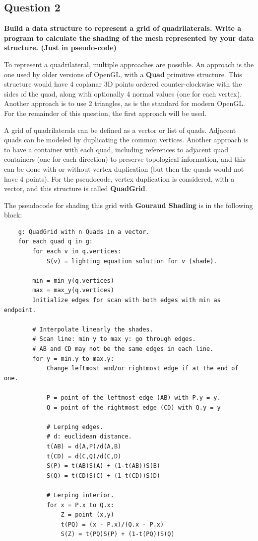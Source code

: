 \documentclass[12pt]{article}
\begin{document}
\subsection*{Question 2}
{\bfseries Build a data structure to represent a grid of quadrilaterals. Write a program to calculate the shading of the mesh represented by your data structure. (Just in pseudo-code)}

To represent a quadrilateral, multiple approaches are possible. An approach is the one used by older versions of OpenGL, with a \textbf{Quad} primitive structure. This structure would have 4 coplanar 3D points ordered counter-clockwise with the sides of the quad, along with optionally 4 normal values (one for each vertex). Another approach is to use 2 triangles, as is the standard for modern OpenGL. For the remainder of this question, the first approach will be used.

A grid of quadrilaterals can be defined as a vector or list of quads. Adjacent quads can be modeled by duplicating the common vertices. Another approach is to have a container with each quad, including references to adjacent quad containers (one for each direction) to preserve topological information, and this can be done with or without vertex duplication (but then the quads would not have 4 points). For the pseudocode, vertex duplication is considered, with a vector, and this structure is called \textbf{QuadGrid}.

The pseudocode for shading this grid with \textbf{Gouraud Shading} is in the following block:
\begin{verbatim}
    g: QuadGrid with n Quads in a vector.
    for each quad q in g:
        for each v in q.vertices:
            S(v) = lighting equation solution for v (shade).
            
        min = min_y(q.vertices)
        max = max_y(q.vertices)
        Initialize edges for scan with both edges with min as endpoint.
        
        # Interpolate linearly the shades.
        # Scan line: min y to max y: go through edges.
        # AB and CD may not be the same edges in each line.
        for y = min.y to max.y:
            Change leftmost and/or rightmost edge if at the end of one.
        
            P = point of the leftmost edge (AB) with P.y = y.
            Q = point of the rightmost edge (CD) with Q.y = y
            
            # Lerping edges.
            # d: euclidean distance.
            t(AB) = d(A,P)/d(A,B)
            t(CD) = d(C,Q)/d(C,D)
            S(P) = t(AB)S(A) + (1-t(AB))S(B)
            S(Q) = t(CD)S(C) + (1-t(CD))S(D)
            
            # Lerping interior.
            for x = P.x to Q.x:
                Z = point (x,y)
                t(PQ) = (x - P.x)/(Q.x - P.x)
                S(Z) = t(PQ)S(P) + (1-t(PQ))S(Q)
\end{verbatim}
\end{document}
